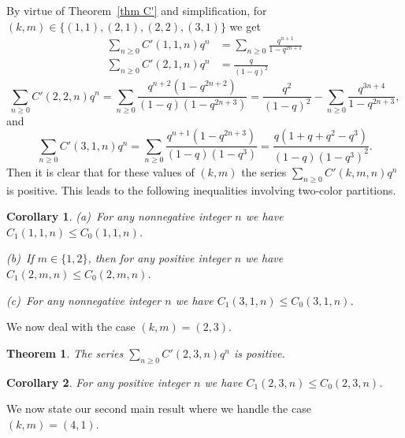\documentclass[reqno]{amsart}
\theoremstyle{definition}
\theoremstyle{plain}
\newtheorem{theorem}    {Theorem}
\newtheorem{corollary}  {Corollary}
\theoremstyle{remark}
\numberwithin{equation}{section}
\newcommand{\fr}{\frac}
\begin{document}
%
By virtue of Theorem~\ref{thm C'} and simplification, for $(k,m)\in\{(1,1),(2,1),(2,2),(3,1)\}$
we get
\begin{align}
\sum_{n\geq 0}C'(1,1,n) q^n &= \sum_{n\geq 0} \fr{q^{n+1}}{1-q^{2n+1}} \label{C'11} \\
\sum_{n\geq 0}C'(2,1,n) q^n &= \fr{q}{(1-q)^2} \label{C'21}
\end{align}
\begin{equation}\label{C'22}
\sum_{n\geq 0}C'(2,2,n) q^n = \sum_{n\geq 0} \fr{q^{n+2}(1-q^{2n+2})}{(1-q)(1-q^{2n+3})}
=\fr{q^2}{(1-q)^2}-\sum_{n\geq 0}\fr{q^{3n+4}}{1-q^{2n+3}},
\end{equation}
and
\begin{equation}\label{C'31}
\sum_{n\geq 0}C'(3,1,n) q^n = \sum_{n\geq 0} \fr{q^{n+1}(1-q^{2n+3})}{(1-q)(1-q^3)}
=\fr{q(1+q+q^2-q^3)}{(1-q)(1-q^3)^2}.
\end{equation}
Then it is clear that for these values of $(k,m)$ the series $\textstyle \sum_{n\geq 0}C'(k,m,n) q^n$ is positive.
This leads to the following inequalities involving two-color partitions.
%
\begin{corollary}\label{cor ineqC1}
(a)\ For any nonnegative integer $n$ we have $C_1(1,1,n) \leq C_0(1,1,n)$.

(b)\ If $m \in\{1,2\}$, then for any positive integer $n$ we have $C_1(2,m,n) \leq C_0(2,m,n)$.

(c)\ For any nonnegative integer $n$ we have $C_1(3,1,n) \leq C_0(3,1,n)$.
\end{corollary}
%
We now deal with the case $(k,m)=(2,3)$.
\begin{theorem}\label{thm positiveC23}
The series $\textstyle \sum_{n\geq 0} C'(2,3,n)q^n$ is positive.
\end{theorem}
\begin{corollary}\label{cor ineqC23}
For any positive integer $n$ we have $C_1(2,3,n) \leq C_0(2,3,n)$.
\end{corollary}
%
We now state our second main result where we handle the case $(k,m)=(4,1)$.
\end{document}
